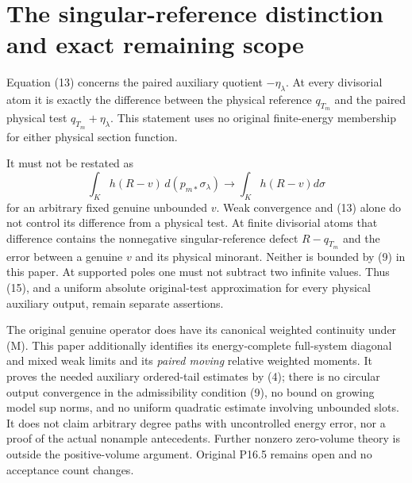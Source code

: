 \documentclass[11pt]{article}
\begin{document}
\section{The singular-reference distinction and exact remaining scope}
Equation (13) concerns the paired auxiliary quotient
$-\eta_\lambda$. At every divisorial atom it is exactly
the difference between the physical reference $q_{T_m}$
and the paired physical test $q_{T_m}+\eta_\lambda$.
This statement uses no original finite-energy membership for
either physical section function.

It must not be restated as
\[
 \int_K h(R-v)\,d(p_{m*}\sigma_\lambda)
       \longrightarrow\int_Kh(R-v)d\sigma
                                                        \tag{15}
\]
for an arbitrary fixed genuine unbounded $v$.
Weak convergence and (13) alone do not control its difference
from a physical test. At finite divisorial atoms that difference
contains the nonnegative singular-reference defect
$R-q_{T_m}$ and the error between a genuine $v$ and its
physical minorant. Neither is bounded by (9) in this paper.
At supported poles one must not subtract two infinite values.
Thus (15), and a uniform absolute original-test approximation
for every physical auxiliary output, remain separate assertions.

The original genuine operator does have its canonical weighted
continuity under (M). This paper additionally identifies its
energy-complete full-system diagonal and mixed weak limits
and its \emph{paired moving} relative weighted moments.
It proves the needed auxiliary ordered-tail estimates by (4);
there is no circular output convergence in the admissibility
condition (9), no bound on growing model sup norms, and no
uniform quadratic estimate involving unbounded slots.
It does not claim arbitrary degree paths with uncontrolled
energy error, nor a proof of the actual nonample antecedents.
Further nonzero zero-volume theory is outside the positive-volume
argument. Original P16.5 remains open and no acceptance count changes.
\end{document}
